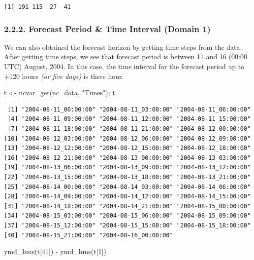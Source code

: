 \documentclass[
  letterpaper,
  DIV=11,
  numbers=noendperiod,
  abstract]{scrartcl}
\newenvironment{Shaded}{\begin{snugshade}}{\end{snugshade}}
\newcommand{\DecValTok}[1]{\textcolor[rgb]{0.68,0.00,0.00}{#1}}
\newcommand{\FunctionTok}[1]{\textcolor[rgb]{0.28,0.35,0.67}{#1}}
\newcommand{\NormalTok}[1]{\textcolor[rgb]{0.00,0.23,0.31}{#1}}
\newcommand{\OtherTok}[1]{\textcolor[rgb]{0.00,0.23,0.31}{#1}}
\newcommand{\SpecialCharTok}[1]{\textcolor[rgb]{0.37,0.37,0.37}{#1}}
\newcommand{\StringTok}[1]{\textcolor[rgb]{0.13,0.47,0.30}{#1}}
\begin{document}
\begin{verbatim}
[1] 191 115  27  41
\end{verbatim}

\hypertarget{forecast-period-time-interval-domain-1}{%
\subsubsection{2.2.2. Forecast Period \& Time Interval (Domain
1)}\label{forecast-period-time-interval-domain-1}}

We can also obtained the forecast horizon by getting time steps from the
data. After getting time steps, we see that forecast period is between
11 and 16 (00:00 UTC) August, 2004. In this case, the time interval for
the forecast period up to +120 hours \emph{(or five days)} is three
hour.

\begin{Shaded}
\begin{Highlighting}[]
\NormalTok{t }\OtherTok{\textless{}{-}} \FunctionTok{ncvar\_get}\NormalTok{(nc\_data, }\StringTok{"Times"}\NormalTok{); t}
\end{Highlighting}
\end{Shaded}

\begin{verbatim}
 [1] "2004-08-11_00:00:00" "2004-08-11_03:00:00" "2004-08-11_06:00:00"
 [4] "2004-08-11_09:00:00" "2004-08-11_12:00:00" "2004-08-11_15:00:00"
 [7] "2004-08-11_18:00:00" "2004-08-11_21:00:00" "2004-08-12_00:00:00"
[10] "2004-08-12_03:00:00" "2004-08-12_06:00:00" "2004-08-12_09:00:00"
[13] "2004-08-12_12:00:00" "2004-08-12_15:00:00" "2004-08-12_18:00:00"
[16] "2004-08-12_21:00:00" "2004-08-13_00:00:00" "2004-08-13_03:00:00"
[19] "2004-08-13_06:00:00" "2004-08-13_09:00:00" "2004-08-13_12:00:00"
[22] "2004-08-13_15:00:00" "2004-08-13_18:00:00" "2004-08-13_21:00:00"
[25] "2004-08-14_00:00:00" "2004-08-14_03:00:00" "2004-08-14_06:00:00"
[28] "2004-08-14_09:00:00" "2004-08-14_12:00:00" "2004-08-14_15:00:00"
[31] "2004-08-14_18:00:00" "2004-08-14_21:00:00" "2004-08-15_00:00:00"
[34] "2004-08-15_03:00:00" "2004-08-15_06:00:00" "2004-08-15_09:00:00"
[37] "2004-08-15_12:00:00" "2004-08-15_15:00:00" "2004-08-15_18:00:00"
[40] "2004-08-15_21:00:00" "2004-08-16_00:00:00"
\end{verbatim}

\begin{Shaded}
\begin{Highlighting}[]
\FunctionTok{ymd\_hms}\NormalTok{(t[}\DecValTok{41}\NormalTok{]) }\SpecialCharTok{{-}} \FunctionTok{ymd\_hms}\NormalTok{(t[}\DecValTok{1}\NormalTok{])}
\end{Highlighting}
\end{Shaded}
\end{document}
